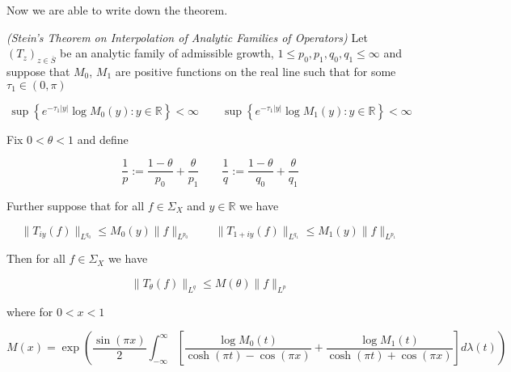 Now we are able to write down the theorem.

\vspace{2mm}

\begin{mdframed}
	\begin{theorem}\emph{(Stein's Theorem on Interpolation of Analytic Families of Operators)}
		Let $\left( T_z \right)_{z \in \overline{S}}$ be an analytic family of admissible growth, $1 \leqslant p_0,p_1,q_0,q_1 \leqslant \infty$ and suppose that $M_0$, $M_1$ are positive functions on the real line such that for some $\tau_1 \in (0,\pi)$

			\begin{equation}
				\sup\left\{e^{-\tau_1 \vert y \vert} \log M_0(y) : y \in \mathbb{R}\right\} < \infty \qquad \sup\left\{e^{-\tau_1 \vert y \vert} \log M_1(y) : y \in \mathbb{R}\right\} < \infty
			\end{equation}

			Fix $0 < \theta < 1$ and define

			\begin{equation}
				\frac{1}{p} := \frac{1 - \theta}{p_0} + \frac{\theta}{p_1} \qquad \frac{1}{q} := \frac{1 - \theta}{q_0} + \frac{\theta}{q_1}
			\end{equation}

			Further suppose that for all $f \in \Sigma_X$ and $y \in \mathbb{R}$ we have

			\begin{equation}
				\|T_{iy}(f)\|_{L^{q_0}} \leqslant M_0(y)\|f\|_{L^{p_0}} \qquad \|T_{1 + iy}(f)\|_{L^{q_1}} \leqslant M_1(y)\|f\|_{L^{p_1}} 
			\end{equation}

			Then for all $f \in \Sigma_X$ we have

			\begin{equation*}
				\|T_\theta(f)\|_{L^q} \leqslant M(\theta)\|f\|_{L^p}
			\end{equation*}

			where for $0 < x < 1$

			\begin{equation*}
				M(x) = \exp\left( \frac{\sin(\pi x)}{2} \int_{-\infty}^\infty \left[ \frac{\log M_0(t)}{\cosh(\pi t) - \cos(\pi x)} + \frac{\log M_1(t)}{\cosh(\pi t) + \cos(\pi x)}\right] d\lambda(t) \right)
			\end{equation*}
	\end{theorem}
\end{mdframed}

